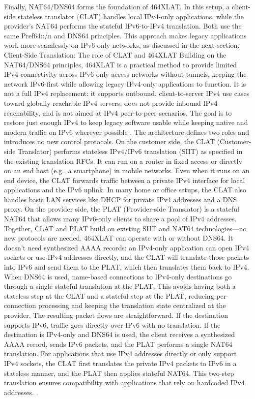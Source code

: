 Finally, NAT64/DNS64 forms the foundation of 464XLAT. In this setup, a client-side stateless translator (CLAT) handles local IPv4-only applications, while the provider's NAT64 performs the stateful IPv6-to-IPv4 translation. Both use the same Pref64::/n and DNS64 principles. This approach makes legacy applications work more seamlessly on IPv6-only networks, as discussed in the next section\cite{6231295}.
Client-Side Translation: The role of CLAT and 464XLAT
Building on the NAT64/DNS64 principles, 464XLAT is a practical method to provide limited IPv4 connectivity across IPv6-only access networks without tunnels, keeping the network IPv6-first while allowing legacy IPv4-only applications to function. It is not a full IPv4 replacement: it supports outbound, client-to-server IPv4 use cases toward globally reachable IPv4 servers, does not provide inbound IPv4 reachability, and is not aimed at IPv4 peer-to-peer scenarios. The goal is to restore just enough IPv4 to keep legacy software usable while keeping native and modern traffic on IPv6 wherever possible \cite{rfc6877}.
The architecture defines two roles and introduces no new control protocols. On the customer side, the CLAT (Customer-side Translator) performs stateless IPv4/IPv6 translation (SIIT) as specified in the existing translation RFCs. It can run on a router in fixed access or directly on an end host (e.g., a smartphone) in mobile networks. Even when it runs on an end device, the CLAT forwards traffic between a private IPv4 interface for local applications and the IPv6 uplink. In many home or office setups, the CLAT also handles basic LAN services like DHCP for private IPv4 addresses and a DNS proxy. On the provider side, the PLAT (Provider-side Translator) is a stateful NAT64 that allows many IPv6-only clients to share a pool of IPv4 addresses. Together, CLAT and PLAT build on existing SIIT and NAT64 technologies—no new protocols are needed\cite{rfc6877}.
464XLAT can operate with or without DNS64. It doesn’t need synthesized AAAA records: an IPv4-only application can open IPv4 sockets or use IPv4 addresses directly, and the CLAT will translate those packets into IPv6 and send them to the PLAT, which then translates them back to IPv4. When DNS64 is used, name-based connections to IPv4-only destinations go through a single stateful translation at the PLAT. This avoids having both a stateless step at the CLAT and a stateful step at the PLAT, reducing per-connection processing and keeping the translation state centralized at the provider\cite{rfc6877}.
The resulting packet flows are straightforward. If the destination supports IPv6, traffic goes directly over IPv6 with no translation. If the destination is IPv4-only and DNS64 is used, the client receives a synthesized AAAA record, sends IPv6 packets, and the PLAT performs a single NAT64 translation. For applications that use IPv4 addresses directly or only support IPv4 sockets, the CLAT first translates the private IPv4 packets to IPv6 in a stateless manner, and the PLAT then applies stateful NAT64. This two-step translation ensures compatibility with applications that rely on hardcoded IPv4 addresses. \cite{rfc6877}.
